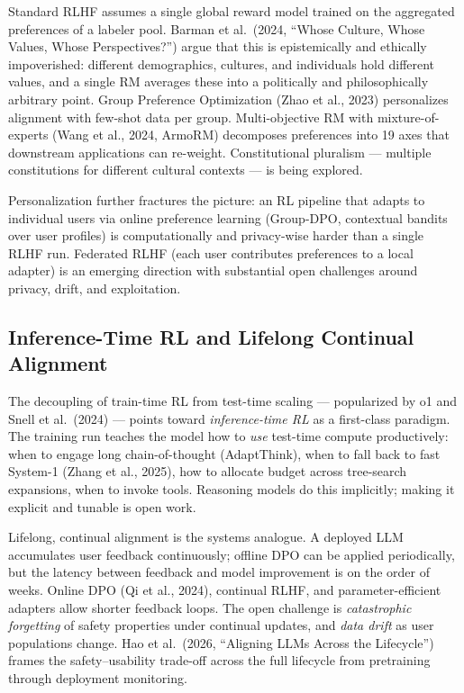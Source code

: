 Standard RLHF assumes a single global reward model trained on the aggregated preferences of a labeler pool. Barman et al.~(2024, ``Whose Culture, Whose Values, Whose Perspectives?'') argue that this is epistemically and ethically impoverished: different demographics, cultures, and individuals hold different values, and a single RM averages these into a politically and philosophically arbitrary point. Group Preference Optimization (Zhao et al., 2023) personalizes alignment with few-shot data per group. Multi-objective RM with mixture-of-experts (Wang et al., 2024, ArmoRM) decomposes preferences into 19 axes that downstream applications can re-weight. Constitutional pluralism --- multiple constitutions for different cultural contexts --- is being explored.

Personalization further fractures the picture: an RL pipeline that adapts to individual users via online preference learning (Group-DPO, contextual bandits over user profiles) is computationally and privacy-wise harder than a single RLHF run. Federated RLHF (each user contributes preferences to a local adapter) is an emerging direction with substantial open challenges around privacy, drift, and exploitation.

\subsection{Inference-Time RL and Lifelong Continual Alignment}\label{inference-time-rl-and-lifelong-continual-alignment}

The decoupling of train-time RL from test-time scaling --- popularized by o1 and Snell et al.~(2024) --- points toward \emph{inference-time RL} as a first-class paradigm. The training run teaches the model how to \emph{use} test-time compute productively: when to engage long chain-of-thought (AdaptThink), when to fall back to fast System-1 (Zhang et al., 2025), how to allocate budget across tree-search expansions, when to invoke tools. Reasoning models do this implicitly; making it explicit and tunable is open work.

Lifelong, continual alignment is the systems analogue. A deployed LLM accumulates user feedback continuously; offline DPO can be applied periodically, but the latency between feedback and model improvement is on the order of weeks. Online DPO (Qi et al., 2024), continual RLHF, and parameter-efficient adapters allow shorter feedback loops. The open challenge is \emph{catastrophic forgetting} of safety properties under continual updates, and \emph{data drift} as user populations change. Hao et al.~(2026, ``Aligning LLMs Across the Lifecycle'') frames the safety--usability trade-off across the full lifecycle from pretraining through deployment monitoring.

